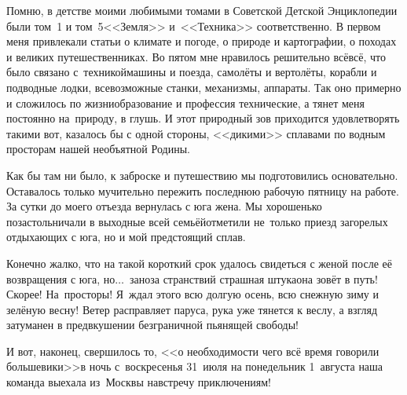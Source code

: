 Помню, в детстве моими любимыми томами в Советской Детской Энциклопедии были том~1 и том~5\mdash <<Земля>> и~<<Техника>> соответственно. В первом меня привлекали статьи о климате и погоде, о природе и картографии, о походах и великих путешественниках. Во пятом мне нравилось решительно всё\mdash всё, что было связано с~техникой\mdash машины и поезда, самолёты и вертолёты, корабли и подводные лодки, всевозможные станки, механизмы, аппараты. Так оно примерно и сложилось по жизни\mdash образование и профессия технические, а тянет меня постоянно на~природу, в глушь. И этот природный зов приходится удовлетворять такими вот, казалось бы с одной стороны, <<дикими>> сплавами по водным просторам нашей необъятной Родины.

Как бы там ни было, к заброске и путешествию мы подготовились основательно. Оставалось только мучительно пережить последнюю рабочую пятницу на работе. За сутки до моего отъезда вернулась с юга жена. Мы хорошенько позастольничали в выходные всей семьёй\mdash отметили не~только приезд загорелых отдыхающих с юга, но и мой предстоящий сплав. 

Конечно жалко, что на такой короткий срок удалось свидеться с женой после её возвращения с юга, но$\ldots$~заноза странствий страшная штука\mdash она зовёт в путь! Скорее! На~просторы! Я~ждал этого всю долгую осень, всю снежную зиму и зелёную весну! Ветер расправляет паруса, рука уже тянется к веслу, а взгляд затуманен в предвкушении безграничной пьянящей свободы!

И вот, наконец, свершилось то, <<о необходимости чего всё время говорили большевики>>\cite{ЛенинПСС}\mdash в ночь с~воскресенья 31~июля на понедельник 1~августа наша команда выехала из~Москвы навстречу приключениям!

\begin{center}
\end{center}
